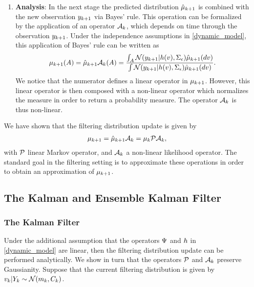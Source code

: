 \documentclass[12pt]{article}
\begin{document}
\begin{enumerate}
\item \textbf{Analysis}: In the next stage the predicted distribution $\predictMeas[\timeStep+1]$ is combined with the new observation $\ddataObs[\timeStep+1]$ via Bayes' rule.
This operation can be formalized by the application of an operator $\analysisOp$, which depends on time through the observation $\ddataObs[\timeStep+1]$. Under the independence 
assumptions in \ref{dynamic_model}, this application of Bayes' rule can be written as 
\begin{align*}
\filterMeas[\timeStep+1](A) = \predictMeas[\timeStep+1] \analysisOp(A) = \frac{\int_A \Gaussian(\ddataObs[\timeStep+1]|\obsOp(\state), \CovNoiseObs) \predictMeas[\timeStep+1](d\state)}{\int \Gaussian(\ddataObs[\timeStep+1]|\obsOp(\state), \CovNoiseObs) \predictMeas[\timeStep+1](d\state)}.
\end{align*}
We notice that the numerator defines a linear operator in $\filterMeas[\timeStep+1]$. However, this linear operator is then composed with a non-linear operator which normalizes the measure 
in order to return a probability measure. The operator $\analysisOp$ is thus non-linear. 
\end{enumerate}

We have shown that the filtering distribution update is given by 
\begin{align}
\filterMeas[\timeStep+1] = \predictMeas[\timeStep+1] \analysisOp = \filterMeas \predictOp \analysisOp,
\end{align}
with $\predictOp$ linear Markov operator, and $\analysisOp$ a non-linear likelihood operator. The standard goal in the filtering setting is to approximate these operations in order 
to obtain an approximation of $\filterMeas[\timeStep+1]$. 

\subsection{The Kalman and Ensemble Kalman Filter}

\subsubsection{The Kalman Filter}
Under the additional assumption that the operators $\fwdOne$ and $\obsOp$ in \ref{dynamic_model} are linear, then the filtering distribution update can be performed 
analytically. We show in turn that the operators $\predictOp$ and $\analysisOp$ preserve Gaussianity. Suppose that the current filtering distribution is given by 
$\dstate|\dataObsCum \sim \Gaussian(\stateMean, \stateCov)$. 
\end{document}

